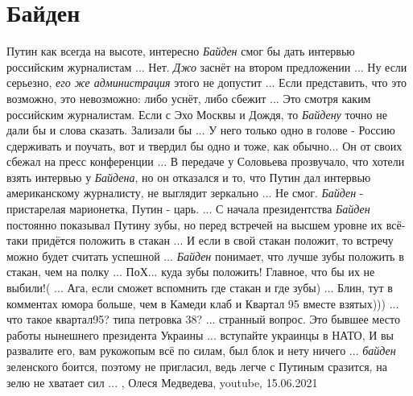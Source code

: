  
 
 
 
 
\chapter{Байден}

Путин как всегда на высоте, интересно \emph{Байден} смог бы дать интервью
российским журналистам ...  Нет. \emph{Джо} заснёт на втором предложении ...
Ну если серьезно, \emph{его же администрация} этого не допустит ...  Если
представить, что это возможно, это невозможно: либо уснёт, либо сбежит ...  Это
смотря каким российским журналистам. Если с Эхо Москвы и Дождя, то
\emph{Байдену} точно не дали бы и слова сказать. Зализали бы ...  У него только
одно в голове -  Россию сдерживать и поучать, вот и твердил бы одно и тоже, как
обычно...  Он от своих сбежал на пресс конференции ...  В передаче у Соловьева
прозвучало, что хотели взять интервью у \emph{Байдена}, но он отказался и то,
что Путин дал интервью американскому журналисту, не выглядит зеркально ... Не
смог. \emph{Байден} - пристарелая марионетка,  Путин - царь. ...  С начала
президентства \emph{Байден} постоянно показывал Путину зубы, но перед встречей
на высшем уровне их всё-таки придётся положить в стакан ...  И если в свой
стакан положит, то встречу можно будет считать успешной ...  \emph{Байден}
понимает, что лучше зубы положить в стакан, чем на полку ...  ПоХ... куда зубы
положить!  Главное, что бы их не выбили!( ...  Ага, если сможет вспомнить где
стакан и где зубы) ...  Блин, тут в комментах юмора больше, чем в Камеди клаб и
Квартал 95 вместе взятых))) ... что такое квартал95? типа петровка 38? ...
странный вопрос. Это бывшее место работы нынешнего президента Украины ...
вступайте украинцы в НАТО, И вы развалите его, вам рукожопым всё по силам, был
блок и нету ничего ... \emph{байден} зеленского боится, поэтому не пригласил,
ведь легче с Путиным сразится, на зелю не хватает сил ... 
,
Олеся Медведева, youtube, 15.06.2021

